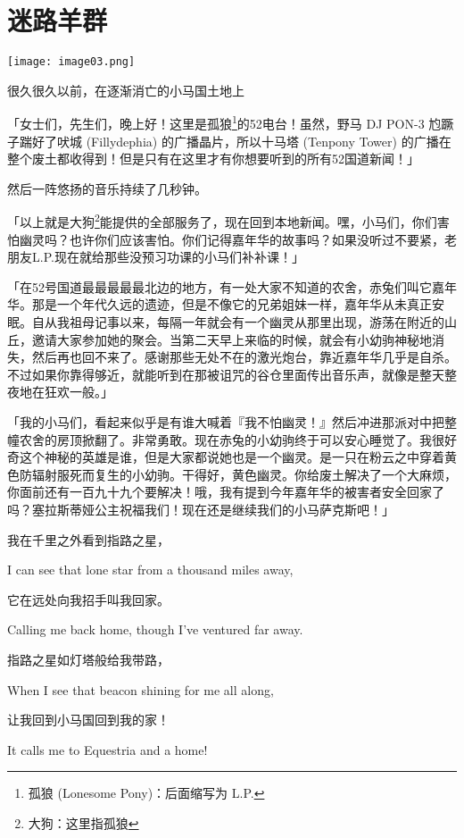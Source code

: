 \chapter{迷路羊群}

\texttt{[image: image03.png]}

\begin{intro}
很久很久以前，在逐渐消亡的小马国土地上
\end{intro}

「{\rt 女士们，先生们，晚上好！这里是孤狼\footnote{孤狼 (Lonesome Pony)：后面缩写为 L.P.}的52电台！虽然，野马 DJ PON-3 尥蹶子踹好了吠城 (Fillydephia) 的广播晶片，所以十马塔 (Tenpony Tower) 的广播在整个废土都收得到！但是只有在这里才有你想要听到的所有52国道新闻！}」

然后一阵悠扬的音乐持续了几秒钟。

「{\rt 以上就是大狗\footnote{大狗：这里指孤狼}能提供的全部服务了，现在回到本地新闻。嘿，小马们，你们害怕幽灵吗？也许你们应该害怕。你们记得嘉年华的故事吗？如果没听过不要紧，老朋友L.P.现在就给那些没预习功课的小马们补补课！}」

「{\rt 在52号国道最最最最最北边的地方，有一处大家不知道的农舍，赤兔们叫它嘉年华。那是一个年代久远的遗迹，但是不像它的兄弟姐妹一样，嘉年华从未真正安眠。自从我祖母记事以来，每隔一年就会有一个幽灵从那里出现，游荡在附近的山丘，邀请大家参加她的聚会。当第二天早上来临的时候，就会有小幼驹神秘地消失，然后再也回不来了。感谢那些无处不在的激光炮台，靠近嘉年华几乎是自杀。不过如果你靠得够近，就能听到在那被诅咒的谷仓里面传出音乐声，就像是整天整夜地在狂欢一般。}」

「{\rt 我的小马们，看起来似乎是有谁大喊着『我不怕幽灵！』然后冲进那派对中把整幢农舍的房顶掀翻了。非常勇敢。现在赤兔的小幼驹终于可以安心睡觉了。我很好奇这个神秘的英雄是谁，但是大家都说她也是一个幽灵。是一只在粉云之中穿着黄色防辐射服死而复生的小幼驹。干得好，黄色幽灵。你给废土解决了一个大麻烦，你面前还有一百九十九个要解决！哦，我有提到今年嘉年华的被害者安全回家了吗？塞拉斯蒂娅公主祝福我们！现在还是继续我们的小马萨克斯吧！}」

\begin{song}
我在千里之外看到指路之星，

I can see that lone star from a thousand miles away,

\medskip

它在远处向我招手叫我回家。

Calling me back home, though I've ventured far away.

\medskip

指路之星如灯塔般给我带路，

When I see that beacon shining for me all along,

\medskip

让我回到小马国回到我的家！

It calls me to Equestria and a home!
\end{song}

